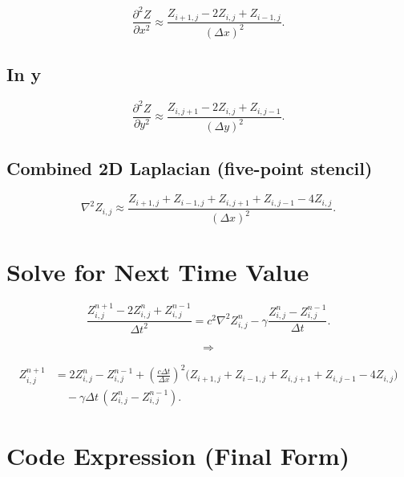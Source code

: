 \documentclass{article}
\begin{document}
\begin{equation}
\frac{\partial^2 Z}{\partial x^2}
\approx
\frac{Z_{i+1,j} - 2Z_{i,j} + Z_{i-1,j}}{(\Delta x)^2}.
\end{equation}

\subsection*{In y}

\begin{equation}
\frac{\partial^2 Z}{\partial y^2}
\approx
\frac{Z_{i,j+1} - 2Z_{i,j} + Z_{i,j-1}}{(\Delta y)^2}.
\end{equation}

\subsection*{Combined 2D Laplacian (five-point stencil)}

\begin{equation}
\nabla^2 Z_{i,j}
\approx
\frac{Z_{i+1,j} + Z_{i-1,j} + Z_{i,j+1} + Z_{i,j-1} - 4Z_{i,j}}{(\Delta x)^2}.
\end{equation}

\newpage

\section*{Solve for Next Time Value}

\begin{equation}
\frac{Z^{n+1}_{i,j} - 2Z^n_{i,j} + Z^{n-1}_{i,j}}{\Delta t^2}
= c^2 \nabla^2 Z^n_{i,j} - \gamma \frac{Z^n_{i,j} - Z^{n-1}_{i,j}}{\Delta t}.
\end{equation}

\[
\Longrightarrow
\]

\begin{equation}
\begin{aligned}
Z^{n+1}_{i,j}
&= 2Z^n_{i,j}
- Z^{n-1}_{i,j}
+ \left(\frac{c \Delta t}{\Delta x}\right)^2 \bigl(Z_{i+1,j} + Z_{i-1,j} + Z_{i,j+1} + Z_{i,j-1} - 4Z_{i,j}\bigr) \\
&\quad - \gamma \Delta t \,(Z^n_{i,j} - Z^{n-1}_{i,j}).
\end{aligned}
\end{equation}

\section*{Code Expression (Final Form)}
\end{document}
